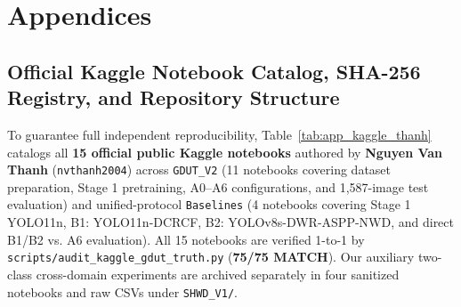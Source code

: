 \chapter{Appendices}
\label{chap:appendices}

\renewcommand{\thesection}{Appendix \Alph{section}}
\setcounter{section}{0}

\section{Official Kaggle Notebook Catalog, SHA-256 Registry, and Repository Structure}
\label{app:kaggle_catalog}

To guarantee full independent reproducibility, Table~\ref{tab:app_kaggle_thanh} catalogs all \textbf{15 official public Kaggle notebooks} authored by \textbf{Nguyen Van Thanh} (\texttt{nvthanh2004}) across \texttt{GDUT\_V2} (11 notebooks covering dataset preparation, Stage 1 pretraining, A0--A6 configurations, and 1,587-image test evaluation) and unified-protocol \texttt{Baselines} (4 notebooks covering Stage 1 YOLO11n, B1: YOLO11n-DCRCF, B2: YOLOv8s-DWR-ASPP-NWD, and direct B1/B2 vs. A6 evaluation). All 15 notebooks are verified 1-to-1 by \nolinkurl{scripts/audit_kaggle_gdut_truth.py} (\textbf{75/75 MATCH}). Our auxiliary two-class cross-domain experiments are archived separately in four sanitized notebooks and raw CSVs under \texttt{SHWD\_V1/}.

